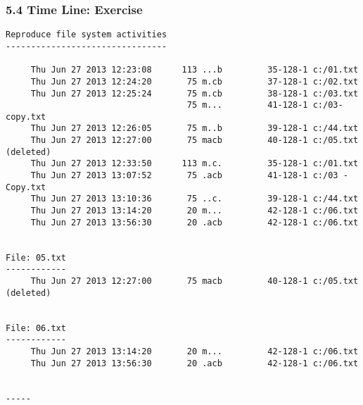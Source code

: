 \begin{frame}[fragile]
  \frametitle{5.4 Time Line: Exercise}
  \begin{lstlisting}[basicstyle=\tiny]
Reproduce file system activities
--------------------------------
  
     Thu Jun 27 2013 12:23:08      113 ...b         35-128-1 c:/01.txt
     Thu Jun 27 2013 12:24:20       75 m.cb         37-128-1 c:/02.txt
     Thu Jun 27 2013 12:25:24       75 m.cb         38-128-1 c:/03.txt
                                    75 m...         41-128-1 c:/03-copy.txt
     Thu Jun 27 2013 12:26:05       75 m..b         39-128-1 c:/44.txt
     Thu Jun 27 2013 12:27:00       75 macb         40-128-1 c:/05.txt (deleted)
     Thu Jun 27 2013 12:33:50      113 m.c.         35-128-1 c:/01.txt
     Thu Jun 27 2013 13:07:52       75 .acb         41-128-1 c:/03 - Copy.txt
     Thu Jun 27 2013 13:10:36       75 ..c.         39-128-1 c:/44.txt
     Thu Jun 27 2013 13:14:20       20 m...         42-128-1 c:/06.txt
     Thu Jun 27 2013 13:56:30       20 .acb         42-128-1 c:/06.txt


File: 05.txt
------------
     Thu Jun 27 2013 12:27:00       75 macb         40-128-1 c:/05.txt (deleted)


File: 06.txt
------------
     Thu Jun 27 2013 13:14:20       20 m...         42-128-1 c:/06.txt
     Thu Jun 27 2013 13:56:30       20 .acb         42-128-1 c:/06.txt


-----
  \end{lstlisting}
\end{frame}


